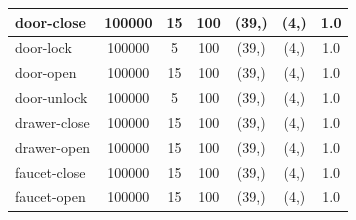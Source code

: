 \documentclass{article}
\theoremstyle{plain}
\theoremstyle{definition}
\theoremstyle{remark}
\begin{document}
\begin{table}[]
{\begin{tabular}{|l|c|c|c|c|c|c|}
door-close                          & 100000                                        & 15                                                   & 100                                             & (39,)                                           & (4,) & 1.0                                            \\ \hline
door-lock                           & 100000                                        & 5                                                    & 100                                             & (39,)                                           & (4,) & 1.0                                            \\ \hline
door-open                           & 100000                                        & 15                                                   & 100                                             & (39,)                                           & (4,) & 1.0                                            \\ \hline
door-unlock                         & 100000                                        & 5                                                    & 100                                             & (39,)                                           & (4,) & 1.0                                            \\ \hline
drawer-close                        & 100000                                        & 15                                                   & 100                                             & (39,)                                           & (4,) & 1.0                                            \\ \hline
drawer-open                         & 100000                                        & 15                                                   & 100                                             & (39,)                                           & (4,) & 1.0                                            \\ \hline
faucet-close                        & 100000                                        & 15                                                   & 100                                             & (39,)                                           & (4,) & 1.0                                            \\ \hline
faucet-open                         & 100000                                        & 15                                                   & 100                                             & (39,)                                           & (4,) & 1.0                                            \\ \hline

\end{tabular}}
\end{table}
\end{document}
